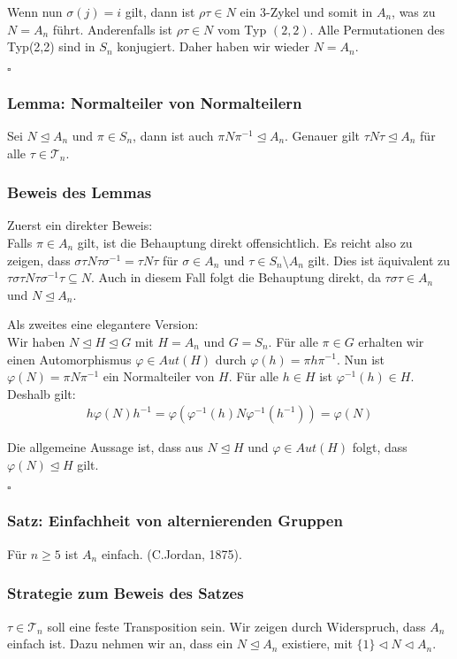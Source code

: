 \documentclass[12pt, german]{article}
\newcommand{\bewiesen}{
	
	\begin{flushright}
		$\square$  \\
\end{flushright}}
\begin{document}
	Wenn nun $\sigma(j) = i$ gilt, dann ist $\rho\tau \in N$ ein $3$-Zykel und somit in $A_n$, was zu $N=A_n$ führt. 
	Anderenfalls ist $\rho\tau \in N$ vom Typ $(2,2)$. Alle Permutationen des Typ(2,2) sind in $S_n$ konjugiert. Daher haben wir wieder $N=A_n$.
	\bewiesen
	
	\subsubsection{Lemma: Normalteiler von Normalteilern}
	Sei $N \trianglelefteq A_n$ und $\pi \in S_n$, dann ist auch $\pi N\pi^{-1} \trianglelefteq A_n$. Genauer gilt $\tau N \tau \trianglelefteq A_n$ für alle $\tau \in \mathcal T_n$.
	\subsubsection{Beweis des Lemmas}
	Zuerst ein direkter Beweis: \\
	Falls $\pi \in A_n$ gilt, ist die Behauptung direkt offensichtlich. Es reicht also zu zeigen, dass $\sigma\tau N\tau\sigma^{-1} = \tau N \tau$ für $\sigma \in A_n$ und $\tau\in S_n \setminus A_n$ gilt. Dies ist äquivalent zu $ \tau \sigma \tau N \tau \sigma^{-1}\tau \subseteq N$. Auch in diesem Fall folgt die Behauptung direkt, da $\tau\sigma\tau \in A_n$ und $N\trianglelefteq A_n$. 
	\newline
	
	Als zweites eine elegantere Version: \\
	Wir haben $N \trianglelefteq H \trianglelefteq G$ mit $H = A_n$ und $G= S_n$. Für alle $\pi \in G$ erhalten wir einen Automorphismus $\varphi \in Aut(H)$ durch $\varphi(h) = \pi h\pi^{-1}$. Nun ist $\varphi(N) = \pi N\pi^{-1}$ ein Normalteiler von $H$. Für alle $h \in H$ ist $\varphi^{-1}(h) \in H$. 
	Deshalb gilt: 
	\begin{align*}
		h\varphi(N)h^{-1} = \varphi(\varphi^{-1}(h)N\varphi^{-1}(h^{-1})) = \varphi(N)
	\end{align*}
	
	Die allgemeine Aussage ist, dass aus $N \trianglelefteq H$ und $\varphi \in Aut(H)$ folgt, dass $\varphi(N) \trianglelefteq H$ gilt. 
	\bewiesen
	
	\subsubsection{Satz: Einfachheit von alternierenden Gruppen}
	Für $n \geq 5$ ist $A_n$ einfach. (C.Jordan, 1875).
	
	\subsubsection{Strategie zum Beweis des Satzes}
	$\tau \in \mathcal T_n$ soll eine feste Transposition sein. Wir zeigen durch Widerspruch, dass $A_n$ einfach ist. Dazu nehmen wir an, dass ein $N \trianglelefteq A_n$ existiere, mit $\{1\} \triangleleft N \triangleleft A_n$.  \\
	
\end{document}

